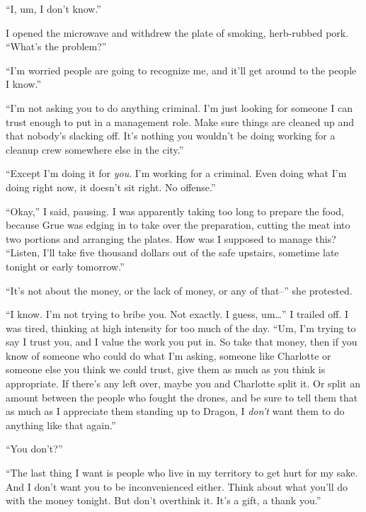 ``I, um, I don't know.''



I opened the microwave and withdrew the plate of smoking, herb-rubbed pork.  ``What's the problem?''



``I'm worried people are going to recognize me, and it'll get around to the people I know.''



``I'm not asking you to do anything criminal.  I'm just looking for someone I can trust enough to put in a management role.  Make sure things are cleaned up and that nobody's slacking off.  It's nothing you wouldn't be doing working for a cleanup crew somewhere else in the city.''



``Except I'm doing it for \emph{you}.  I'm working for a criminal.  Even doing what I'm doing right now, it doesn't sit right.  No offense.''



``Okay,'' I said, pausing.  I was apparently taking too long to prepare the food, because Grue was edging in to take over the preparation, cutting the meat into two portions and arranging the plates.  How was I supposed to manage this?  ``Listen, I'll take five thousand dollars out of the safe upstairs, sometime late tonight or early tomorrow.''



``It's not about the money, or the lack of money, or any of that--'' she protested.



``I know.  I'm not trying to bribe you.  Not exactly.  I guess, um\ldots'' I trailed off.  I was tired, thinking at high intensity for too much of the day.  ``Um, I'm trying to say I trust you, and I value the work you put in.  So take that money, then if you know of someone who could do what I'm asking, someone like Charlotte or someone else you think we could trust, give them as much as you think is appropriate.  If there's any left over, maybe you and Charlotte split it.  Or split an amount between the people who fought the drones, and be sure to tell them that as much as I appreciate them standing up to Dragon, I \emph{don't} want them to do anything like that again.''



``You don't?''



``The last thing I want is people who live in my territory to get hurt for my sake.  And I don't want you to be inconvenienced either.  Think about what you'll do with the money tonight.  But don't overthink it.  It's a gift, a thank you.''



